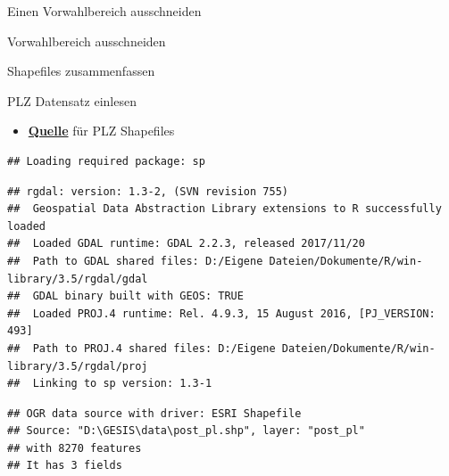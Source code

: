 \documentclass[ignorenonframetext,]{beamer}
\providecommand{\tightlist}{%
  \setlength{\itemsep}{0pt}\setlength{\parskip}{0pt}}
\begin{document}
\begin{frame}{Einen Vorwahlbereich ausschneiden}
\protect\hypertarget{einen-vorwahlbereich-ausschneiden}{}

\end{frame}

\begin{frame}{Vorwahlbereich ausschneiden}
\protect\hypertarget{vorwahlbereich-ausschneiden}{}

\end{frame}

\begin{frame}{Shapefiles zusammenfassen}
\protect\hypertarget{shapefiles-zusammenfassen}{}

\end{frame}

\begin{frame}[fragile]{PLZ Datensatz einlesen}
\protect\hypertarget{plz-datensatz-einlesen}{}

\begin{itemize}
\tightlist
\item
  \href{http://arnulf.us/PLZ}{\textbf{Quelle}} für PLZ Shapefiles
\end{itemize}

\begin{verbatim}
## Loading required package: sp
\end{verbatim}

\begin{verbatim}
## rgdal: version: 1.3-2, (SVN revision 755)
##  Geospatial Data Abstraction Library extensions to R successfully loaded
##  Loaded GDAL runtime: GDAL 2.2.3, released 2017/11/20
##  Path to GDAL shared files: D:/Eigene Dateien/Dokumente/R/win-library/3.5/rgdal/gdal
##  GDAL binary built with GEOS: TRUE 
##  Loaded PROJ.4 runtime: Rel. 4.9.3, 15 August 2016, [PJ_VERSION: 493]
##  Path to PROJ.4 shared files: D:/Eigene Dateien/Dokumente/R/win-library/3.5/rgdal/proj
##  Linking to sp version: 1.3-1
\end{verbatim}

\begin{verbatim}
## OGR data source with driver: ESRI Shapefile 
## Source: "D:\GESIS\data\post_pl.shp", layer: "post_pl"
## with 8270 features
## It has 3 fields
\end{verbatim}

\end{frame}
\end{document}
